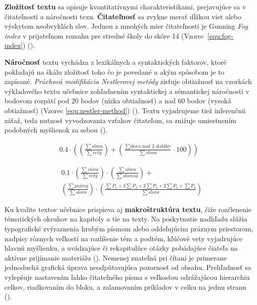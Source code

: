 \textbf{Zložitosť textu} sa opisuje kvantitatívnymi charakteristikami, prejavujúce sa v čitateľnosti a náročnosti texu. \textbf{Čitateľnosť} sa zvykne merať dĺžkou viet alebo výskytom neobvyklách slov. Jednou z mnohých mier čitateľnosti je Gunning \emph{Fog index} v prijateľnom rozsahu pre stredné školy do skóre 14 (Vzorec~\ref{equ:fog-index}) (\cite{drahosova_hodnotenie_2014}). 

\textbf{Náročnosť} textu vychádza z lexikálnych a syntaktických faktorov, ktoré pokladajú na škálu zložitosť toho čo je povedané a akým spôsobom je to zapísané. \emph{Průchová modifikácia Nestlerovej metódy} zisťuje obtiažnosť na vzorkách výkladového textu učebnice zohľadnením syntaktickej a sémantickej náročnosti  v bodovom rozpätí pod 20 bodov (nízka obtiažnosť) a nad 60 bodov (vysoká obtiažnosť) (Vzorec \ref{equ:nestler-method}) (\cite{drahosova_hodnotenie_2014}). Textu vyjadrujeme tiež inferenčnú záťaž, teda nutnosť vyvodzovania vzťahov čitateľom, sa znižuje umiestnením podobných myšlienok za sebou (\cite{pavlovkin_ziak_1989}).

\begin{ceqn}\begin{align}
0.4 \cdot \left(\left(\frac{\sum slova}{\sum vety}\right) + 
\left(\frac{\sum \text{slova nad 2 slabiky}}{\sum slova}\cdot 100\right)\right)
\label{equ:fog-index}
\end{align}\end{ceqn}

\begin{equation}\begin{split}
& 0.1 \cdot \left(\frac{\sum slova}{\sum vety}\right) \cdot  \left(\frac{\sum slova}{\sum slovesa}\right) + \\
& \left(\frac{\sum pojmy}{\sum slova}\right) \cdot \left(\frac{\sum P_1 + 3\sum P_2 + 2\sum P_3 + 2\sum P_4 + \sum P_4}{\sum slova}\right)
\label{equ:nestler-method}
\end{split}\end{equation}

Ku kvalite textov učebnice prispieva aj \textbf{makroštruktúra textu}, čiže rozčlenenie tématických okruhov na kapitoly a tie na texty. Na poskytnutie nadhľadu slúžia typografické zvýraznenia hrubým písmom alebo oddeľujúcim práznym priestorom, nadpisy rôznych veľkostí na rozlíšenie tém a podtém, kľúčové vety vyjadrujúce hlavnú myšlienku, a uvádzajúce či rekapitulúce otázky pobádajúce čiateľa na aktívne prijímanie materiálu (\cite{pavlovkin_ziak_1989}). Nemenej znateľná pri čítaní je primerane jednoduchá grafická úprava neodpútavajúca pozornosť od obsahu. Prehľadnosť sa vylepšuje nastavením ľahko čitateľného písma s veľkosťou odrážajúcou hierarchiu celkov, riadkovaním do bloku, a zalamovaním príkladov v celku na jednu stranu (\cite{mlady_tvorba_1988}).

